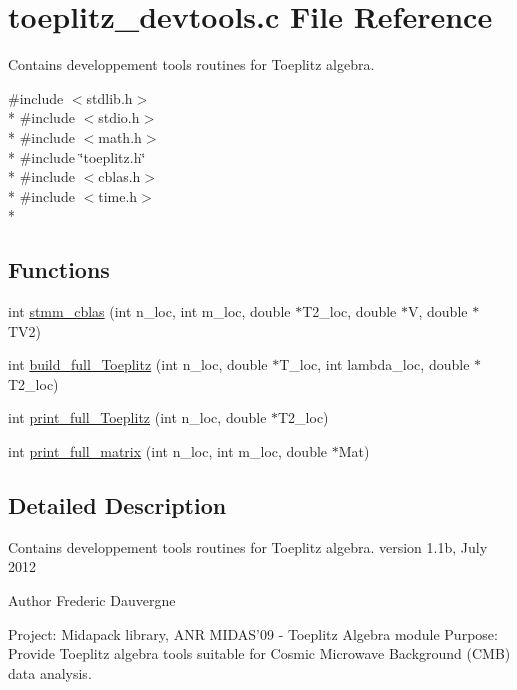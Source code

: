 \section{toeplitz\-\_\-devtools.\-c File Reference}
\label{toeplitz__devtools_8c}


Contains developpement tools routines for Toeplitz algebra.  


{\ttfamily \#include $<$stdlib.\-h$>$}\\*
{\ttfamily \#include $<$stdio.\-h$>$}\\*
{\ttfamily \#include $<$math.\-h$>$}\\*
{\ttfamily \#include \char`\"{}toeplitz.\-h\char`\"{}}\\*
{\ttfamily \#include $<$cblas.\-h$>$}\\*
{\ttfamily \#include $<$time.\-h$>$}\\*
\subsection*{Functions}
\begin{DoxyCompactItemize}
\item 
int \hyperlink{toeplitz__devtools_8c_a71116d783c96f008961a7649d3700cf8}{stmm\-\_\-cblas} (int n\-\_\-loc, int m\-\_\-loc, double $\ast$T2\-\_\-loc, double $\ast$V, double $\ast$T\-V2)
\item 
int \hyperlink{toeplitz__devtools_8c_abbd7fe6341c689dad56b05bd5093b0d4}{build\-\_\-full\-\_\-\-Toeplitz} (int n\-\_\-loc, double $\ast$T\-\_\-loc, int lambda\-\_\-loc, double $\ast$T2\-\_\-loc)
\item 
int \hyperlink{toeplitz__devtools_8c_a217227b5c1d2a02676a40b022d8069c0}{print\-\_\-full\-\_\-\-Toeplitz} (int n\-\_\-loc, double $\ast$T2\-\_\-loc)
\item 
int \hyperlink{toeplitz__devtools_8c_a74fdfdd84a1c878470423c304dcebe90}{print\-\_\-full\-\_\-matrix} (int n\-\_\-loc, int m\-\_\-loc, double $\ast$Mat)
\end{DoxyCompactItemize}


\subsection{Detailed Description}
Contains developpement tools routines for Toeplitz algebra. version 1.\-1b, July 2012 \begin{DoxyAuthor}{Author}
Frederic Dauvergne
\end{DoxyAuthor}
Project\-: Midapack library, A\-N\-R M\-I\-D\-A\-S'09 -\/ Toeplitz Algebra module Purpose\-: Provide Toeplitz algebra tools suitable for Cosmic Microwave Background (C\-M\-B) data analysis.

